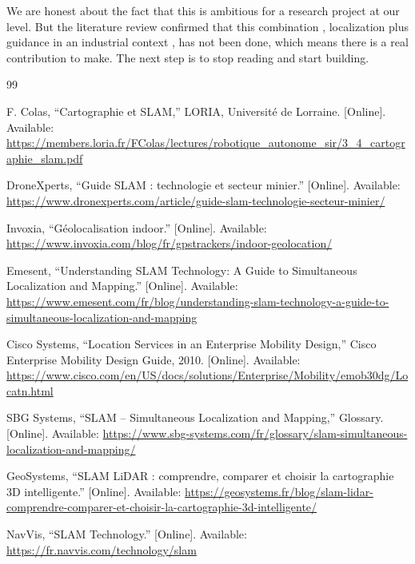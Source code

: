 \documentclass{ipgpmaster}
\begin{document}
We are honest about the fact that this is ambitious for a research project at our level. But the literature review confirmed that this combination ,  localization plus guidance in an industrial context ,  has not been done, which means there is a real contribution to make. The next step is to stop reading and start building.



\begin{thebibliography}{99}

F. Colas, ``Cartographie et SLAM,'' LORIA, Université de Lorraine. [Online]. Available: \url{https://members.loria.fr/FColas/lectures/robotique_autonome_sir/3_4_cartographie_slam.pdf}

DroneXperts, ``Guide SLAM : technologie et secteur minier.'' [Online]. Available: \url{https://www.dronexperts.com/article/guide-slam-technologie-secteur-minier/}

Invoxia, ``Géolocalisation indoor.'' [Online]. Available: \url{https://www.invoxia.com/blog/fr/gpstrackers/indoor-geolocation/}

Emesent, ``Understanding SLAM Technology: A Guide to Simultaneous Localization and Mapping.'' [Online]. Available: \url{https://www.emesent.com/fr/blog/understanding-slam-technology-a-guide-to-simultaneous-localization-and-mapping}

Cisco Systems, ``Location Services in an Enterprise Mobility Design,'' Cisco Enterprise Mobility Design Guide, 2010. [Online]. Available: \url{https://www.cisco.com/en/US/docs/solutions/Enterprise/Mobility/emob30dg/Locatn.html}

SBG Systems, ``SLAM -- Simultaneous Localization and Mapping,'' Glossary. [Online]. Available: \url{https://www.sbg-systems.com/fr/glossary/slam-simultaneous-localization-and-mapping/}

GeoSystems, ``SLAM LiDAR : comprendre, comparer et choisir la cartographie 3D intelligente.'' [Online]. Available: \url{https://geosystems.fr/blog/slam-lidar-comprendre-comparer-et-choisir-la-cartographie-3d-intelligente/}

NavVis, ``SLAM Technology.'' [Online]. Available: \url{https://fr.navvis.com/technology/slam}


\end{thebibliography}
\end{document}
